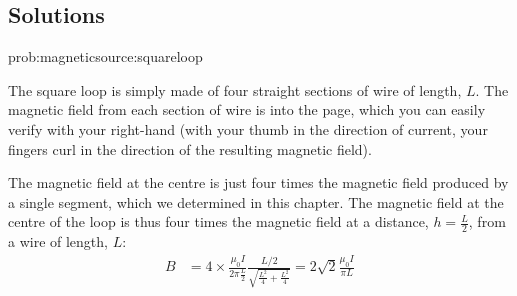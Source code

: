 \newpage
\subsection{Solutions}
\begin{solution}{prob:magneticsource:squareloop}
{\label{soln:magneticsource:squareloop}
The square loop is simply made of four straight sections of wire of length, $L$. The magnetic field from each section of wire is into the page, which you can easily verify with your right-hand (with your thumb in the direction of current, your fingers curl in the direction of the resulting magnetic field). 

The magnetic field at the centre is just four times the magnetic field produced by a single segment, which we determined in this chapter. The magnetic field at the centre of the loop is thus four times the magnetic field at a distance, $h=\frac{L}{2}$, from a wire of length, $L$:
\begin{align*}
B &= 4\times\frac{\mu_0 I}{2\pi \frac{L}{2}}\frac{L/2}{\sqrt{\frac{L^2}{4}+\frac{L^2}{4}}}=2\sqrt 2\frac{\mu_0 I}{\pi L}
\end{align*}
}
\end{solution}

